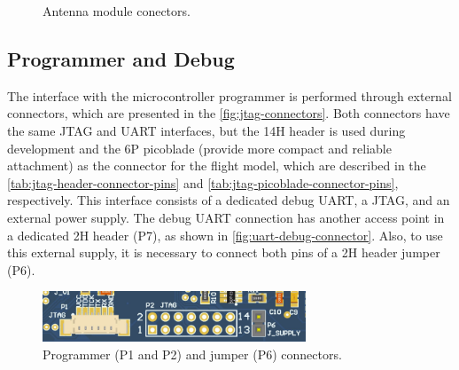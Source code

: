 \begin{figure}[!htb]
    \begin{center}
        \qquad
        \caption{Antenna module conectors.}
        \label{fig:ant-connectors}
    \end{center}
\end{figure}

\subsection{Programmer and Debug} \label{sec:programer-and-debug}

The interface with the microcontroller programmer is performed through external connectors, which are presented in the \autoref{fig:jtag-connectors}. Both connectors have the same JTAG and UART interfaces, but the 14H header is used during development and the 6P picoblade (provide more compact and reliable attachment) as the connector for the flight model, which are described in the \autoref{tab:jtag-header-connector-pins} and \autoref{tab:jtag-picoblade-connector-pins}, respectively. This interface consists of a dedicated debug UART, a JTAG, and an external power supply. The debug UART connection has another access point in a dedicated 2H header (P7), as shown in \autoref{fig:uart-debug-connector}. Also, to use this external supply, it is necessary to connect both pins of a 2H header jumper (P6).

\begin{figure}[!ht]
    \begin{center}
        \includegraphics[width=0.7\textwidth]{figures/jtag-connector.png}
        \caption{Programmer (P1 and P2) and jumper (P6) connectors.}
        \label{fig:jtag-connectors}
    \end{center}
\end{figure}

